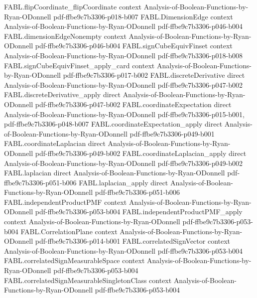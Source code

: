 \begin{theorem}
\proofstep
  {FABL.flipCoordinate_flipCoordinate}
  {context}
  {Analysis-of-Boolean-Functions-by-Ryan-ODonnell}
  {pdf-ffbe9c7b3306-p018-b007}
\proofstep
  {FABL.DimensionEdge}
  {context}
  {Analysis-of-Boolean-Functions-by-Ryan-ODonnell}
  {pdf-ffbe9c7b3306-p046-b004}
\proofstep
  {FABL.dimensionEdgeNonempty}
  {context}
  {Analysis-of-Boolean-Functions-by-Ryan-ODonnell}
  {pdf-ffbe9c7b3306-p046-b004}
\proofstep
  {FABL.signCubeEquivFinset}
  {context}
  {Analysis-of-Boolean-Functions-by-Ryan-ODonnell}
  {pdf-ffbe9c7b3306-p018-b008}
\proofstep
  {FABL.signCubeEquivFinset_apply_card}
  {context}
  {Analysis-of-Boolean-Functions-by-Ryan-ODonnell}
  {pdf-ffbe9c7b3306-p017-b002}
\proofstep
  {FABL.discreteDerivative}
  {direct}
  {Analysis-of-Boolean-Functions-by-Ryan-ODonnell}
  {pdf-ffbe9c7b3306-p047-b002}
\proofstep
  {FABL.discreteDerivative_apply}
  {direct}
  {Analysis-of-Boolean-Functions-by-Ryan-ODonnell}
  {pdf-ffbe9c7b3306-p047-b002}
\proofstep
  {FABL.coordinateExpectation}
  {direct}
  {Analysis-of-Boolean-Functions-by-Ryan-ODonnell}
  {pdf-ffbe9c7b3306-p015-b001,
    pdf-ffbe9c7b3306-p048-b007}
\proofstep
  {FABL.coordinateExpectation_apply}
  {direct}
  {Analysis-of-Boolean-Functions-by-Ryan-ODonnell}
  {pdf-ffbe9c7b3306-p049-b001}
\proofstep
  {FABL.coordinateLaplacian}
  {direct}
  {Analysis-of-Boolean-Functions-by-Ryan-ODonnell}
  {pdf-ffbe9c7b3306-p049-b002}
\proofstep
  {FABL.coordinateLaplacian_apply}
  {direct}
  {Analysis-of-Boolean-Functions-by-Ryan-ODonnell}
  {pdf-ffbe9c7b3306-p049-b002}
\proofstep
  {FABL.laplacian}
  {direct}
  {Analysis-of-Boolean-Functions-by-Ryan-ODonnell}
  {pdf-ffbe9c7b3306-p051-b006}
\proofstep
  {FABL.laplacian_apply}
  {direct}
  {Analysis-of-Boolean-Functions-by-Ryan-ODonnell}
  {pdf-ffbe9c7b3306-p051-b006}
\proofstep
  {FABL.independentProductPMF}
  {context}
  {Analysis-of-Boolean-Functions-by-Ryan-ODonnell}
  {pdf-ffbe9c7b3306-p053-b004}
\proofstep
  {FABL.independentProductPMF_apply}
  {context}
  {Analysis-of-Boolean-Functions-by-Ryan-ODonnell}
  {pdf-ffbe9c7b3306-p053-b004}
\proofstep
  {FABL.CorrelationPlane}
  {context}
  {Analysis-of-Boolean-Functions-by-Ryan-ODonnell}
  {pdf-ffbe9c7b3306-p014-b001}
\proofstep
  {FABL.correlatedSignVector}
  {context}
  {Analysis-of-Boolean-Functions-by-Ryan-ODonnell}
  {pdf-ffbe9c7b3306-p053-b004}
\proofstep
  {FABL.correlatedSignMeasurableSpace}
  {context}
  {Analysis-of-Boolean-Functions-by-Ryan-ODonnell}
  {pdf-ffbe9c7b3306-p053-b004}
\proofstep
  {FABL.correlatedSignMeasurableSingletonClass}
  {context}
  {Analysis-of-Boolean-Functions-by-Ryan-ODonnell}
  {pdf-ffbe9c7b3306-p053-b004}

\end{theorem}
